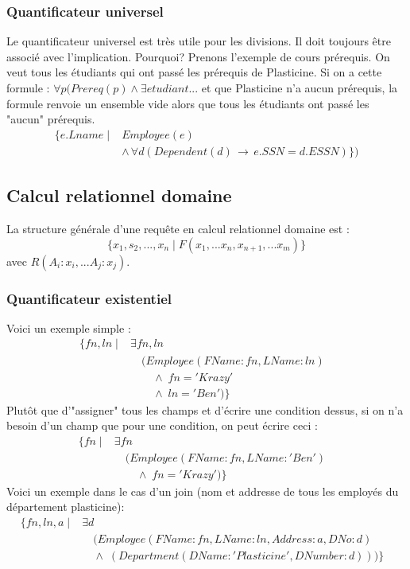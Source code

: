 \documentclass[a4paper]{article}
\begin{document}
  \subsubsection{Quantificateur universel}
  Le quantificateur universel est très utile pour les divisions.
  Il doit toujours être associé avec l'implication. Pourquoi? Prenons l'exemple
  de cours prérequis. On veut tous les étudiants qui ont passé les prérequis
  de Plasticine. Si on a cette formule : $\forall p (Prereq(p) \land \exists etudiant ...$ et que Plasticine n'a aucun prérequis, la formule renvoie un ensemble
  vide alors que tous les étudiants ont passé les "aucun" prérequis.
  \begin{align*}
    \{e.Lname\; | \; &Employee(e)\\
    &\land\, \forall d (Dependent(d) \,\rightarrow\, e.SSN = d.ESSN)\} )
  \end{align*}

  \subsection{Calcul relationnel domaine}
  La structure générale d'une requête en calcul relationnel domaine est :
  $$ \{x_1, s_2,...,x_n\; | \; F(x_1, ... x_n,x_{n+1},...x_{m})\} $$
  avec $R(A_i:x_i,...A_j:x_j)$.

  \subsubsection{Quantificateur existentiel}
  Voici un exemple simple :
  \begin{align*}
    \{fn, ln\; |\; &\exists fn, ln & \\
    &\quad(Employee(FName:fn, LName:ln)\\
    &\quad\quad\land\;fn='Krazy'\\
    &\quad\quad\land\; ln='Ben')\}
  \end{align*}
  Plutôt que d'"assigner" tous les champs et d'écrire une condition dessus,
  si on n'a besoin d'un champ que pour une condition, on peut écrire ceci :
  \begin{align*}
    \{fn\; |\; &\exists fn & \\
    &\quad(Employee(FName:fn, LName:'Ben')\\
    &\quad\quad\land\;fn='Krazy')\}
  \end{align*}
  Voici un exemple dans le cas d'un join (nom et addresse de tous les employés
  du département plasticine):
  \begin{align*}
    \{fn, ln, a\; |\; &\exists d & \\
    &\quad(Employee(FName:fn, LName:ln, Address:a, DNo:d)\\
    &\quad\land\;(Department(DName:'Plasticine', DNumber:d)))\}
  \end{align*}
\end{document}

